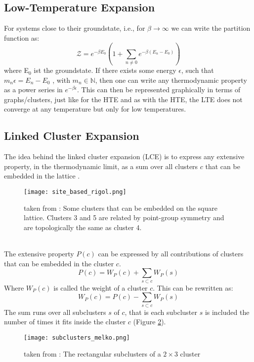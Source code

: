 \documentclass{article}
\begin{document}
\subsection{Low-Temperature Expansion}
For systems close to their groundstate, i.e., for $\beta \to \infty$
we can write the partition function as:
\begin{equation}
\label{eq:12}
\mathcal{Z} = e^{-\beta E_0} \left( 1 + \sum\limits_{n \neq 0}
  e^{-\beta (E_n - E_0)} \right)
\end{equation}
where E$_0$ ist the groundstate. If there exists some energy
$\epsilon$, such that $m_n \epsilon = E_n - E_0$ , with $m_n \in
\mathbb{N}$, then one can write any thermodynamic property as a power
series in $e^{-\beta \epsilon}$. This can then be represented
graphically in terms of  graphs/clusters, just like for the HTE
\cite{Rigol,Series} and as with the HTE, the LTE does not converge at
any temperature but only for low temperatures.

\subsection{Linked Cluster Expansion}
The idea behind the linked cluster expansion (LCE) is to
express any extensive property, in the thermodynamic limit, as a sum
over all clusters $c$ that can be embedded in the lattice
\cite{Rigol}.\\
\begin{figure}[htbp]
\centerline{\texttt{[image: site\_based\_rigol.png]}}
\caption[]{\label{fig:3} taken from \cite{Rigol}: Some clusters that can be embedded on the
  square lattice. Clusters 3 and 5 are related by point-group symmetry and are topologically the same as cluster 4.}
\end{figure}\\
The extensive property $P(c)$ can be expressed by all contributions of
clusters that can be embedded in the cluster $c$.\\
\begin{equation}
\label{eq:9}
P(c) = W_P(c) + \sum\limits_{s \subset c} W_P(s)
\end{equation}
Where $W_P(c)$ is called the weight of a cluster $c$.
This can be rewritten as:
\begin{equation}
\label{eq:4}
W_P(c) = P(c) - \sum\limits_{s \subset c} W_P(s)
\end{equation}
The sum runs over all subclusters $s$ of $c$, that is each subcluster $s$ is
included the number of times it fits inside the cluster $c$ (Figure \ref{fig:sub}).
\begin{figure}[htbp]
\centerline{\texttt{[image: subclusters\_melko.png]}}
\caption[]{\label{fig:sub} taken from \cite{Melko}: The rectangular subclusters of a $2 \times 3$ cluster}
\end{figure}
\end{document}
